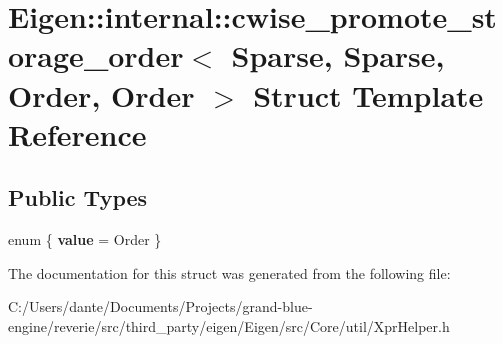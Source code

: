 \hypertarget{struct_eigen_1_1internal_1_1cwise__promote__storage__order_3_01_sparse_00_01_sparse_00_01_order_00_01_order_01_4}{}\section{Eigen\+::internal\+::cwise\+\_\+promote\+\_\+storage\+\_\+order$<$ Sparse, Sparse, Order, Order $>$ Struct Template Reference}
\label{struct_eigen_1_1internal_1_1cwise__promote__storage__order_3_01_sparse_00_01_sparse_00_01_order_00_01_order_01_4}
\subsection*{Public Types}
\begin{DoxyCompactItemize}
\item 
\mbox{\label{struct_eigen_1_1internal_1_1cwise__promote__storage__order_3_01_sparse_00_01_sparse_00_01_order_00_01_order_01_4_a24be1a6a0a0f0f3968fc5a72aa2974cc}} 
enum \{ {\bfseries value} = Order
 \}
\end{DoxyCompactItemize}


The documentation for this struct was generated from the following file\+:\begin{DoxyCompactItemize}
\item 
C\+:/\+Users/dante/\+Documents/\+Projects/grand-\/blue-\/engine/reverie/src/third\+\_\+party/eigen/\+Eigen/src/\+Core/util/Xpr\+Helper.\+h\end{DoxyCompactItemize}
